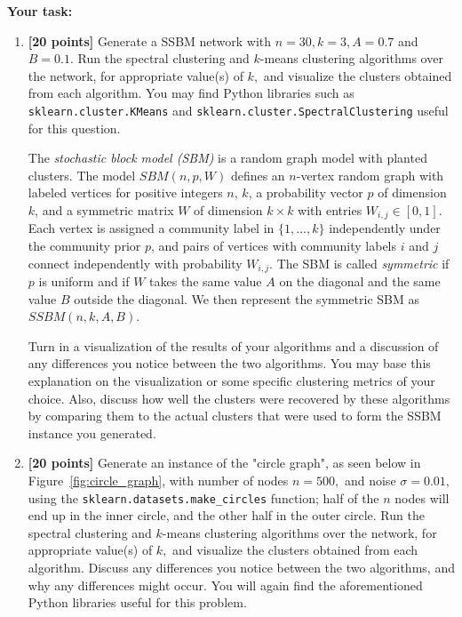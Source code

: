 \documentclass[11pt]{article}
\begin{document}
\noindent \textbf{Your task:}

\begin{enumerate}[label=(\alph*)]

\item \textbf{[20 points]}
Generate a SSBM network with $n=30, k=3, A=0.7$ and $B=0.1$. Run the spectral clustering and $k$-means clustering algorithms over the network, for appropriate value(s) of $k,$ and visualize the clusters obtained from each algorithm. You may find Python libraries such as \texttt{sklearn.cluster.KMeans} and \texttt{sklearn.cluster.SpectralClustering} useful for this question. 

\begin{tcolorbox}[colback=gray!10, colframe=gray!50, title=Reminder]
The \textit{stochastic block model (SBM)} is a random graph model with planted clusters. %
The model $SBM(n, p, W)$ defines an $n$-vertex random graph with labeled vertices for positive integers $n$, $k$, a probability vector $p$ of dimension $k$, and a symmetric matrix $W$ of dimension $k \times k$ with entries $W_{i,j} \in [0, 1]$. Each vertex is assigned a community label in $\{1,..., k\}$ independently under the community prior $p$, and pairs of vertices with community labels $i$ and $j$ connect independently with probability $W_{i,j}$. The SBM is called \emph{symmetric} if $p$ is uniform and if $W$ takes the same value $A$ on the diagonal and the same value $B$ outside the diagonal. We then represent the symmetric SBM as $SSBM(n, k, A, B)$.
\end{tcolorbox}

 

Turn in a visualization of the results of your algorithms and a discussion of any differences you notice between the two algorithms. You may base this explanation on the visualization or some specific clustering metrics of your choice.  Also, discuss how well the clusters were recovered by these algorithms by comparing them to the actual clusters that were used to form the SSBM instance you generated.

\item \textbf{[20 points]} Generate an instance of the "circle graph", as seen below in Figure~\ref{fig:circle_graph}, with number of nodes $n = 500,$ and noise $\sigma = 0.01,$ using the \texttt{sklearn.datasets.make\_circles} function; half of the $n$ nodes will end up in the inner circle, and the other half in the outer circle. Run the spectral clustering and $k$-means clustering algorithms over the network, for appropriate value(s) of $k,$ and visualize the clusters obtained from each algorithm. Discuss any differences you notice between the two algorithms, and why any differences might occur. You will again find the aforementioned Python libraries useful for this problem.


\end{enumerate}
\end{document}
